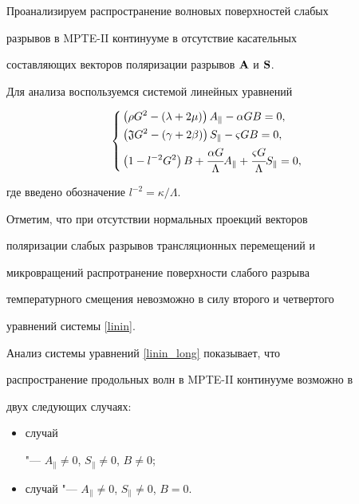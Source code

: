 Проанализируем распространение волновых поверхностей слабых

разрывов в MPTE-II континууме в отсутствие касательных

составляющих векторов поляризации разрывов ${\bf A}$ и ${\bf S}$.

Для анализа воспользуемся системой линейных уравнений

\begin{equation}\label{linin_long}

\left\{

\begin{aligned}

&\left(\rho G^2 - (\lambda + 2\mu) \right)

A_\parallel -\alpha G B= 0,\\

&\left({\mathfrak J} G^2 - (\gamma + 2

\beta) \right) S_{\parallel} -\varsigma G B= 0, \\

&\left(1- l^{-2}G^2 \right) B + \cfrac{\alpha G}{\Lambda}A_\parallel + \cfrac{\varsigma

G}{\Lambda} S_{\parallel}=0,

\end{aligned}

\right.

\end{equation}

где введено обозначение $l^{-2}={\kappa}/{\Lambda}$.



Отметим, что при отсутствии нормальных проекций векторов

поляризации слабых разрывов трансляционных перемещений и

микровращений распротранение поверхности слабого разрыва

температурного смещения невозможно в силу второго и четвертого

уравнений системы \eqref{linin}.



Анализ системы уравнений \eqref{linin_long} показывает, что

распространение продольных волн в MPTE-II континууме возможно в

двух следующих случаях:





\begin{itemize}



\item[\rm I] случай

"--- $A_\parallel  \ne 0$, $S_{\parallel}  \ne 0$, $B \ne

0$;



\item[\rm II]  случай "--- $A_\parallel  \ne 0$, $S_{\parallel}  \ne 0$, $B =

0$.

\end{itemize}



